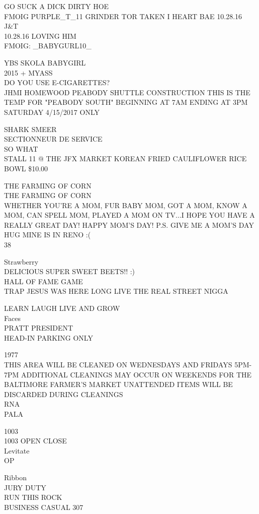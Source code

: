 \documentclass[10pt,letterpaper]{article}
\begin{document}
GO SUCK A DICK DIRTY HOE\\
FMOIG PURPLE\_T\_11 GRINDER TOR TAKEN I HEART BAE  10.28.16 J\&T\\
10.28.16 LOVING HIM\\
FMOIG: \_BABYGURL10\_

YBS SKOLA BABYGIRL\\
2015 + MYASS\\
DO YOU USE E{-}CIGARETTES?\\
JHMI HOMEWOOD PEABODY SHUTTLE CONSTRUCTION THIS IS THE TEMP FOR "PEABODY SOUTH" BEGINNING AT 7AM ENDING AT 3PM SATURDAY 4/15/2017 ONLY

SHARK SMEER\\
SECTIONNEUR DE SERVICE\\
SO WHAT\\
STALL 11 @ THE JFX MARKET KOREAN FRIED CAULIFLOWER RICE BOWL \$10.00

THE FARMING OF CORN\\
THE FARMING OF CORN\\
WHETHER YOU'RE A MOM, FUR BABY MOM, GOT A MOM, KNOW A MOM, CAN SPELL MOM, PLAYED A MOM ON TV...I HOPE YOU HAVE A REALLY GREAT DAY!  HAPPY MOM'S DAY!  P.S. GIVE ME A MOM'S DAY HUG MINE IS IN RENO :(\\
38

Strawberry\\
DELICIOUS SUPER SWEET BEETS!! :)\\
HALL OF FAME GAME\\
TRAP JESUS WAS HERE LONG LIVE THE REAL STREET NIGGA

LEARN LAUGH LIVE AND GROW\\
Faces\\
PRATT PRESIDENT\\
HEAD{-}IN PARKING ONLY

1977\\
THIS AREA WILL BE CLEANED ON WEDNESDAYS AND FRIDAYS 5PM{-}7PM ADDITIONAL CLEANINGS MAY OCCUR ON WEEKENDS FOR THE BALTIMORE FARMER'S MARKET UNATTENDED ITEMS WILL BE DISCARDED DURING CLEANINGS\\
RNA\\
PALA

1003\\
1003 OPEN CLOSE\\
Levitate\\
OP

Ribbon\\
JURY DUTY\\
RUN THIS ROCK\\
BUSINESS CASUAL 307
\end{document}

